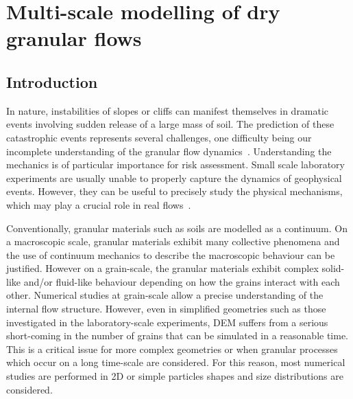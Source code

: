 \chapter{Multi-scale modelling of dry granular flows}

\ifpdf
    \graphicspath{{Chapter4/figs/raster/}{Chapter4/figs/pdf/}{Chapter4/figs/}}
\else
    \graphicspath{{Chapter4/figs/vector/}{Chapter4/figs/}}
\fi

\section{Introduction}

In nature, instabilities of slopes or cliffs can manifest themselves in 
dramatic events involving 
sudden release of a large mass of soil. The prediction of these catastrophic 
events represents several challenges, one difficulty being our incomplete 
understanding of the granular flow dynamics~\citep{Rondon2011}. Understanding 
the mechanics is of particular importance for risk assessment. Small scale 
laboratory experiments are usually unable to properly capture the 
dynamics of geophysical events. However, they can be useful to precisely study 
the physical mechanisms, which may play a crucial role in real 
flows~\citep{Iverson1997}. 

Conventionally, granular materials such as soils are modelled as a continuum. 
On a macroscopic scale, granular materials exhibit many collective phenomena 
and the use of continuum mechanics to describe the macroscopic behaviour can be 
justified. However on a grain-scale, the granular materials exhibit complex 
solid-like and/or fluid-like behaviour depending on how the grains interact 
with each other. Numerical studies at grain-scale allow a precise 
understanding of the internal flow structure. However, even in simplified 
geometries such as those investigated in the laboratory-scale experiments, DEM 
suffers from a serious short-coming in the number of grains that can be 
simulated in a reasonable time. This is a critical issue for more complex 
geometries or when granular processes which occur on a long time-scale are 
considered. For this reason, most numerical studies are 
performed in 2D or simple particles shapes and size distributions are 
considered. 

